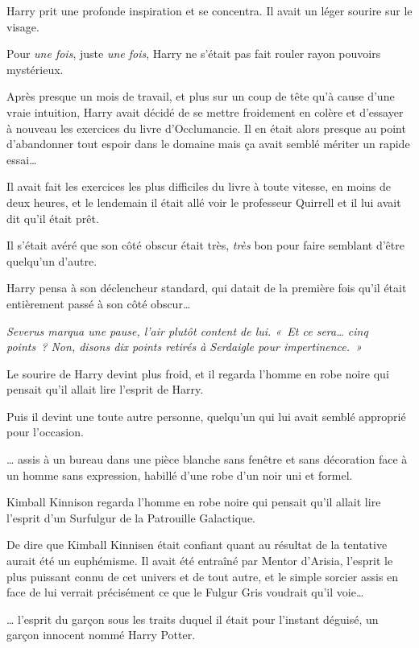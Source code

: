 Harry prit une profonde inspiration et se concentra.
Il avait un léger sourire sur le visage.

Pour \emph{une fois}, juste \emph{une fois}, Harry ne s'était pas fait rouler rayon pouvoirs mystérieux.

Après presque un mois de travail, et plus sur un coup de tête qu'à cause d'une vraie intuition, Harry avait décidé de se mettre froidement en colère et d'essayer à nouveau les exercices du livre d'Occlumancie.
Il en était alors presque au point d'abandonner tout espoir dans le domaine mais ça avait semblé mériter un rapide essai…

Il avait fait les exercices les plus difficiles du livre à toute vitesse, en moins de deux heures, et le lendemain il était allé voir le professeur Quirrell et il lui avait dit qu'il était prêt.

Il s'était avéré que son côté obscur était très, \emph{très} bon pour faire semblant d'être quelqu'un d'autre.

Harry pensa à son déclencheur standard, qui datait de la première fois qu'il était entièrement passé à son côté obscur…

\emph{Severus marqua une pause, l'air plutôt content de lui.
«~Et ce sera… cinq points~?
Non, disons dix points retirés à Serdaigle pour impertinence.~»}

Le sourire de Harry devint plus froid, et il regarda l'homme en robe noire qui pensait qu'il allait lire l'esprit de Harry.

Puis il devint une toute autre personne, quelqu'un qui lui avait semblé approprié pour l'occasion.

\later

… assis à un bureau dans une pièce blanche sans fenêtre et sans décoration face à un homme sans expression, habillé d’une robe d'un noir uni et formel.

Kimball Kinnison regarda l'homme en robe noire qui pensait qu'il allait lire l'esprit d'un Surfulgur de la Patrouille Galactique.

De dire que Kimball Kinnisen était confiant quant au résultat de la tentative aurait été un euphémisme.
Il avait été entraîné par Mentor d'Arisia, l'esprit le plus puissant connu de cet univers et de tout autre, et le simple sorcier assis en face de lui verrait précisément ce que le Fulgur Gris voudrait qu'il voie…

… l'esprit du garçon sous les traits duquel il était pour l'instant déguisé, un garçon innocent nommé Harry Potter.

